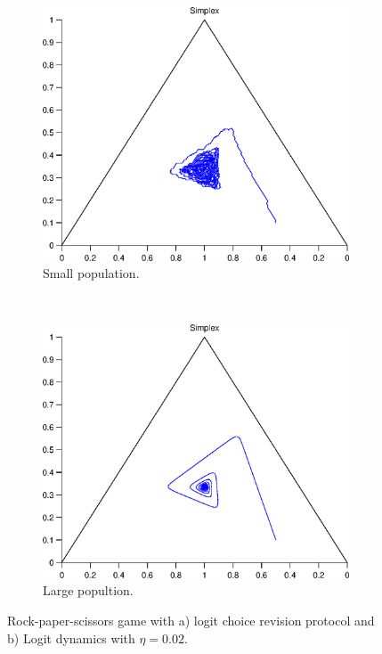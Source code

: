 \documentclass[a4paper,10pt]{article}
\begin{document}
\begin{figure}[tbh]
  \centering
  \begin{subfigure}[b]{0.4\textwidth}
	  \includegraphics[width=\textwidth]{./images/test_finite_logit_choice.eps}
	  \caption{Small population.}
	  \label{fig:finite4_protocol}
  \end{subfigure}
  ~ 
  \begin{subfigure}[b]{0.4\textwidth}
	  \includegraphics[width=\textwidth]{./images/test1_simplex_logit.eps}
	  \caption{Large popultion.}
	  \label{fig:finite4_dynamics}
  \end{subfigure}
  \caption{Rock-paper-scissors game with a) logit choice revision protocol and b) Logit dynamics with $\eta=0.02$.}
  \label{fig:finite4}
\end{figure}
\end{document}
